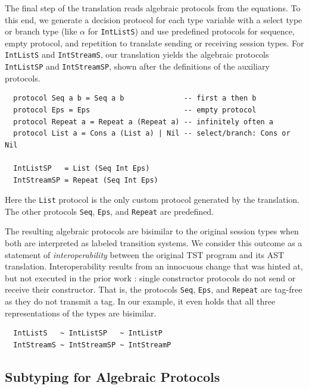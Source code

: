 The final step of the translation reads algebraic protocols from
the equations. To this end, we generate a decision protocol for each
type variable with a select type or branch type (like $\alpha$ for
\lstinline|IntListS|) and use predefined protocols for sequence, empty
protocol, and repetition to translate sending or receiving session
types. For \lstinline|IntListS| and \lstinline|IntStreamS|, our
translation yields
the algebraic protocols \lstinline{IntListSP} and
\lstinline{IntStreamSP}, shown after the definitions of the auxiliary protocols.
\begin{lstlisting}
  protocol Seq a b = Seq a b              -- first a then b
  protocol Eps = Eps                      -- empty protocol
  protocol Repeat a = Repeat a (Repeat a) -- infinitely often a
  protocol List a = Cons a (List a) | Nil -- select/branch: Cons or Nil

  IntListSP   = List (Seq Int Eps)
  IntStreamSP = Repeat (Seq Int Eps)
\end{lstlisting}
Here the \lstinline+List+ protocol is the only custom protocol
generated by the translation. The other protocols \lstinline+Seq+,
\lstinline+Eps+, and \lstinline+Repeat+ are predefined.

The resulting algebraic protocols are bisimilar to the
original session types when both are interpreted as labeled
transition systems. We consider this outcome as a statement of
\emph{interoperability} between the original TST program and its AST
translation.  Interoperability results
from an innocuous change that was hinted at, but not executed in the
prior work \cite{DBLP:journals/pacmpl/MordidoS0V23}: single
constructor protocols do not send or receive their constructor. That
is, the protocols \lstinline|Seq|, \lstinline|Eps|, and
\lstinline|Repeat| are tag-free as they do not transmit a tag.
In our example, it even holds that all three representations of the
types are bisimilar.
\begin{lstlisting}
  IntListS   ~ IntListSP   ~ IntListP
  IntStreamS ~ IntStreamSP ~ IntStreamP
\end{lstlisting}

\subsection{Subtyping for Algebraic Protocols}
\label{sec:subtyp-algebr-prot}


